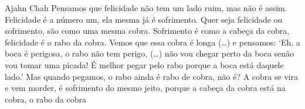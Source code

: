
\begin{quotepage}{0.6\linewidth}{Ajahn Chah}
Pensamos que felicidade não tem um lado ruim, mas não é assim.
Felicidade é a número um, ela mesma já é sofrimento. Quer seja
felicidade ou sofrimento, são como uma mesma cobra. Sofrimento é como a
cabeça da cobra, felicidade é o rabo da cobra. Vemos que essa cobra é
longa (…) e pensamos: ‘Eh, a boca é perigosa, o rabo não tem perigo,
(…) não vou chegar perto da boca senão vou tomar uma picada! É melhor
pegar pelo rabo porque a boca está daquele lado.’ Mas quando pegamos, o
rabo ainda é rabo de cobra, não é? A cobra se vira e vem morder, é
sofrimento do mesmo jeito, porque a cabeça da cobra está na cobra, o
rabo da cobra 
\end{quotepage}


